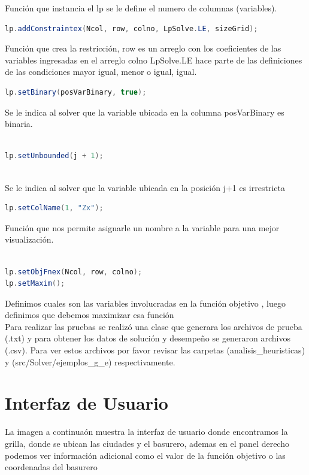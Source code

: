 \documentclass[10pt]{article}
\begin{document}
Funci\'on que instancia el lp se le define el numero de columnas (variables). 


\begin{lstlisting}[language=Java]
lp.addConstraintex(Ncol, row, colno, LpSolve.LE, sizeGrid);
\end{lstlisting}
Funci\'on que crea la restricci\'on, row es un arreglo con los coeficientes de las variables ingresadas en el arreglo colno   LpSolve.LE hace parte de las definiciones de las condiciones mayor igual, menor o igual, igual.

\begin{lstlisting}[language=Java]
lp.setBinary(posVarBinary, true);
\end{lstlisting}
Se le indica al solver que la variable ubicada en la columna posVarBinary es binaria.

\begin{lstlisting}[language=Java]

lp.setUnbounded(j + 1);
  
\end{lstlisting}

Se le indica al solver que la variable ubicada en la posici\'on j+1 es irrestricta

\begin{lstlisting}[language=Java]
lp.setColName(1, "Zx");
\end{lstlisting}
Funci\'on que nos permite asignarle un nombre a la variable para una mejor visualizaci\'on.


\begin{lstlisting}[language=Java]

lp.setObjFnex(Ncol, row, colno);
lp.setMaxim();	

\end{lstlisting}
Definimos cuales son las variables involucradas en la funci\'on objetivo , luego  definimos que debemos maximizar esa funci\'on\\

Para realizar las pruebas se realizó una clase que generara los archivos de prueba (.txt) y para obtener los datos de solución y desempeño se generaron archivos (.csv). Para ver estos
archivos por favor revisar las carpetas (analisis\_heuristicas) y (src/Solver/ejemplos\_g\_e) respectivamente.

\section{Interfaz de Usuario}
La imagen a continua\'on muestra la interfaz de usuario donde encontramos la grilla, donde se ubican las ciudades y el basurero, ademas en el panel derecho podemos ver informaci\'on adicional como el valor de la funci\'on objetivo o las coordenadas del basurero
\end{document}
